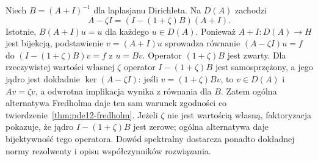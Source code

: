 \begin{uwaga}
Niech $B=(A+I)^{-1}$ dla laplasjanu Dirichleta.
Na $D(A)$ zachodzi
\[
 A-\zeta I=(I-(1+\zeta)B)(A+I).
\]
Istotnie, $B(A+I)u=u$ dla każdego $u\in D(A)$.
Ponieważ $A+I:D(A)\to H$ jest bijekcją, podstawienie
$v=(A+I)u$ sprowadza równanie $(A-\zeta I)u=f$
do $(I-(1+\zeta)B)v=f$ z $u=Bv$.
Operator $(1+\zeta)B$ jest zwarty.
Dla rzeczywistej wartości własnej $\zeta$ operator
$I-(1+\zeta)B$ jest samosprzężony, a jego jądro
jest dokładnie $\ker(A-\zeta I)$: jeśli
$v=(1+\zeta)Bv$, to $v\in D(A)$ i $Av=\zeta v$,
a odwrotna implikacja wynika z równania dla $B$.
Zatem ogólna alternatywa Fredholma daje ten sam
warunek zgodności co twierdzenie~\ref{thm:pde12-fredholm}.
Jeżeli $\zeta$ nie jest wartością własną, faktoryzacja
pokazuje, że jądro $I-(1+\zeta)B$ jest zerowe;
ogólna alternatywa daje bijektywność tego operatora.
Dowód spektralny dostarcza ponadto dokładnej normy
rezolwenty i opisu współczynników rozwiązania.
\end{uwaga}



